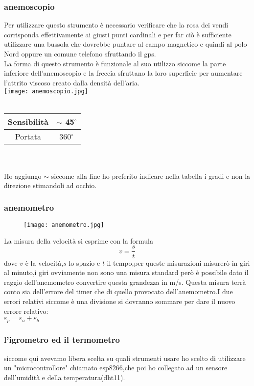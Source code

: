 \documentclass[12pt]{article}
\begin{document}
\subsubsection{anemoscopio}
Per utilizzare questo strumento è necessario verificare che la  rosa dei vendi corrisponda effettivamente ai giusti punti cardinali e per far ciò è sufficiente utilizzare una bussola che dovrebbe puntare al campo magnetico e quindi al polo Nord oppure un comune telefono sfruttando il gps.\\
La forma di questo strumento è funzionale al suo utilizzo siccome la parte inferiore dell'anemoscopio e la freccia sfruttano la loro superficie per aumentare l'attrito viscoso creato dalla densità dell'aria.\\
    \texttt{[image: anemoscopio.jpg]} \\ \\
   \begin{tabular}{|c|S|}
    \hline
    Sensibilità & $\sim$ 45$^{\circ}$\\
    \hline
    Portata & 360$^{\circ}$\\
    \hline
\end{tabular}\\\\
Ho aggiungo $\sim$ siccome alla fine ho preferito indicare nella tabella i gradi e non la direzione stimandoli ad occhio.
\subsubsection{anemometro}
\begin{wrapfigure}{r}{6cm}
        \centering
        \texttt{[image: anemometro.jpg]}
\end{wrapfigure}
La misura della velocità si esprime con la formula
$$v=\dfrac{s}{t}$$
dove $v$ è la velocità,$s$ lo spazio e $t$ il tempo,per queste misurazioni misurerò in giri al minuto,i giri ovviamente non sono una misura standard però è possibile dato il raggio dell'anemometro convertire questa grandezza in m/s.
Questa misura terrà conto sia dell'errore del timer che di quello provocato dell'anemometro.I due errori relativi siccome è una divisione si dovranno sommare per dare il nuovo errore relativo: \\
$\varepsilon_p=\varepsilon_a + \varepsilon_b$
\subsubsection{l'igrometro ed il termometro}
siccome qui avevamo libera scelta su quali strumenti usare ho scelto di utilizzare un "microcontrollore" chiamato esp8266,che poi ho collegato ad un sensore dell'umidità e della temperatura(dht11).
\end{document}
